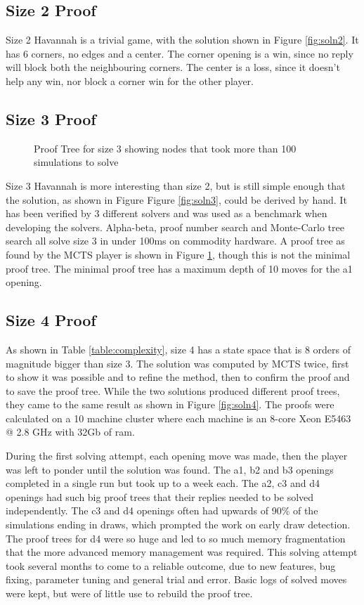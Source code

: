 \subsection{Size 2 Proof}

Size 2 Havannah is a trivial game, with the solution shown in Figure \ref{fig:soln2}. It has 6 corners, no edges and a center. The corner opening is a win, since no reply will block both the neighbouring corners. The center is a loss, since it doesn't help any win, nor block a corner win for the other player.

\subsection{Size 3 Proof}

\begin{figure}
\centering

\caption{Proof Tree for size 3 showing nodes that took more than 100 simulations to solve}
\label{fig:proof3}
\end{figure}

Size 3 Havannah is more interesting than size 2, but is still simple enough that the solution, as shown in Figure Figure \ref{fig:soln3}, could be derived by hand. It has been verified by 3 different solvers and was used as a benchmark when developing the solvers. Alpha-beta, proof number search and Monte-Carlo tree search all solve size 3 in under 100ms on commodity hardware. A proof tree as found by the MCTS player is shown in Figure \ref{fig:proof3}, though this is not the minimal proof tree. The minimal proof tree has a maximum depth of 10 moves for the a1 opening.


\subsection{Size 4 Proof}\label{sec:size4proof}

As shown in Table \ref{table:complexity}, size 4  has a state space that is 8 orders of magnitude bigger than size 3. The solution was computed by MCTS twice, first to show it was possible and to refine the method, then to confirm the proof and to save the proof tree. While the two solutions produced different proof trees, they came to the same result as shown in Figure \ref{fig:soln4}. The proofs were calculated on a 10 machine cluster where each machine is an 8-core Xeon E5463 @ 2.8 GHz with 32Gb of ram.

During the first solving attempt, each opening move was made, then the player was left to ponder until the solution was found. The a1, b2 and b3 openings completed in a single run but took up to a week each. The a2, c3 and d4 openings had such big proof trees that their replies needed to be solved independently. The c3 and d4 openings often had upwards of 90\% of the simulations ending in draws, which prompted the work on early draw detection. The proof trees for d4 were so huge and led to so much memory fragmentation that the more advanced memory management was required. This solving attempt took several months to come to a reliable outcome, due to new features, bug fixing, parameter tuning and general trial and error. Basic logs of solved moves were kept, but were of little use to rebuild the proof tree.


